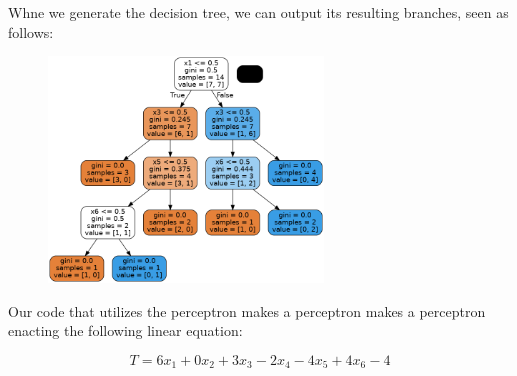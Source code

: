 \documentclass{article}
\begin{document}
Whne we generate the decision tree, we can output its resulting branches, seen as follows:

\begin{figure}[H]
    \centering
    \includegraphics[width = 0.65\textwidth]{tree.png}
\end{figure}

Our code that utilizes the perceptron makes a perceptron makes a perceptron enacting the following linear equation:

\begin{equation}
    T = 6x_1 + 0x_2 + 3x_3 - 2x_4 - 4x_5 + 4x_6 - 4
\end{equation}
\end{document}
